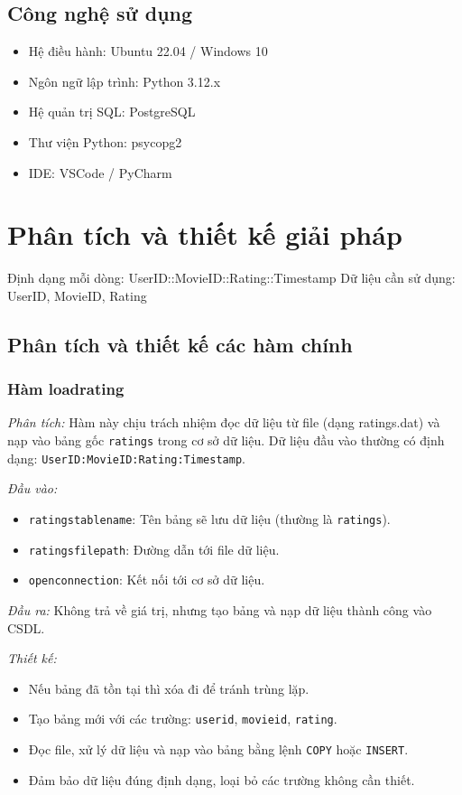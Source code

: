 \documentclass[14pt]{extarticle}
\begin{document}
\subsection{Công nghệ sử dụng}
\begin{itemize}
    \item Hệ điều hành: Ubuntu 22.04 / Windows 10
    \item Ngôn ngữ lập trình: Python 3.12.x
    \item Hệ quản trị SQL: PostgreSQL
    \item Thư viện Python: psycopg2
    \item IDE: VSCode / PyCharm
\end{itemize}



\clearpage
\section{Phân tích và thiết kế giải pháp}
Định dạng mỗi dòng: UserID::MovieID::Rating::Timestamp
Dữ liệu cần sử dụng: UserID, MovieID, Rating


\subsection{Phân tích và thiết kế các hàm chính}
\subsubsection{Hàm loadrating}

\textit{Phân tích:}  
Hàm này chịu trách nhiệm đọc dữ liệu từ file (dạng ratings.dat) và nạp vào bảng gốc \texttt{ratings} trong cơ sở dữ liệu. Dữ liệu đầu vào thường có định dạng: \texttt{UserID:MovieID:Rating:Timestamp}.

\textit{Đầu vào:}
\begin{itemize}
    \item \texttt{ratingstablename}: Tên bảng sẽ lưu dữ liệu (thường là \texttt{ratings}).
    \item \texttt{ratingsfilepath}: Đường dẫn tới file dữ liệu.
    \item \texttt{openconnection}: Kết nối tới cơ sở dữ liệu.
\end{itemize}

\textit{Đầu ra:}  
Không trả về giá trị, nhưng tạo bảng và nạp dữ liệu thành công vào CSDL.

\textit{Thiết kế:}
\begin{itemize}
    \item Nếu bảng đã tồn tại thì xóa đi để tránh trùng lặp.
    \item Tạo bảng mới với các trường: \texttt{userid}, \texttt{movieid}, \texttt{rating}.
    \item Đọc file, xử lý dữ liệu và nạp vào bảng bằng lệnh \texttt{COPY} hoặc \texttt{INSERT}.
    \item Đảm bảo dữ liệu đúng định dạng, loại bỏ các trường không cần thiết.
\end{itemize}
\end{document}
